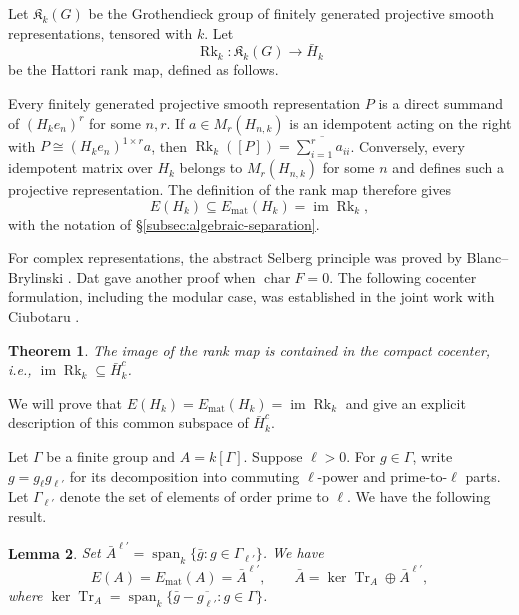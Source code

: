 \documentclass[11pt,letterpaper]{amsart}
\newtheorem{theorem}{Theorem}
\newtheorem{lemma}[theorem]{Lemma}
\theoremstyle{definition}
\numberwithin{equation}{section}
\numberwithin{theorem}{section}
\newcommand{\kk}{k}
\newcommand{\cK}{\mathfrak K}
\DeclareMathOperator{\Tr}{Tr}
\DeclareMathOperator{\Rk}{Rk}
\DeclareMathOperator{\im}{im}
\DeclareMathOperator{\spanop}{span}
\begin{document}
Let $\cK_\kk(G)$ be the Grothendieck group of finitely
generated projective smooth representations, tensored with
$\kk$. Let
\[
 \Rk_\kk:\cK_\kk(G)\longrightarrow\bar H_\kk
\]
be the Hattori rank map, defined as follows. 

Every finitely generated projective smooth representation
$P$ is a direct summand of $(H_\kk e_n)^r$ for some $n,r$.
If $a\in M_r(H_{n,\kk})$ is an idempotent acting on the
right with $P\cong(H_\kk e_n)^{1\times r}a$, then $\Rk_\kk([P])=\overline{\sum_{i=1}^r a_{ii}}$.
Conversely, every idempotent matrix over $H_\kk$ belongs to $M_r(H_{n,\kk})$ for some $n$ and defines such a projective representation. The definition of the rank map therefore gives
\[
 E(H_\kk)\subseteq E_{\mathrm{mat}}(H_\kk)
                    =\im\Rk_\kk,
\]
with the notation of \S\ref{subsec:algebraic-separation}.

For complex representations, the abstract Selberg
principle was proved by Blanc--Brylinski \cite{BB}.
Dat \cite{DatSelberg} gave another proof when
$\operatorname{char}F=0$. The following cocenter
formulation, including the modular case, was established
in the joint work with Ciubotaru
\cite[Theorem~7.1]{CHIII}.

\begin{theorem}
\label{thm:abstract-selberg}
The image of the rank map is contained in the compact
cocenter, i.e.,  $\im\Rk_\kk\subseteq\bar H_\kk^c$.
\end{theorem}

We will prove that $E(H_\kk)=E_{\mathrm{mat}}(H_\kk)=\im\Rk_\kk$ and give an explicit description of this common subspace of $\bar H_\kk^c$.

Let $\Gamma$ be a finite group and $A=\kk[\Gamma]$. Suppose $\ell>0$. For $g\in\Gamma$, write $g=g_\ell g_{\ell'}$ for its
decomposition into commuting $\ell$-power and prime-to-$\ell$
parts. Let
$\Gamma_{\ell'}$ denote the set of elements of order prime to $\ell$. We have the following result. 

\begin{lemma}\label{lem:finite-regular}
Set $\bar A^{\ell'}=\spanop_\kk\{\bar g:g\in\Gamma_{\ell'}\}$. 
We have
\[
 E(A)=E_{\mathrm{mat}}(A)=\bar A^{\ell'},
 \qquad
 \bar A=\ker\Tr_A\oplus\bar A^{\ell'},
\]
where $\ker\Tr_A
   =\spanop_\kk\{\bar g-\overline{g_{\ell'}}:g\in\Gamma\}$. 
\end{lemma}
\end{document}
